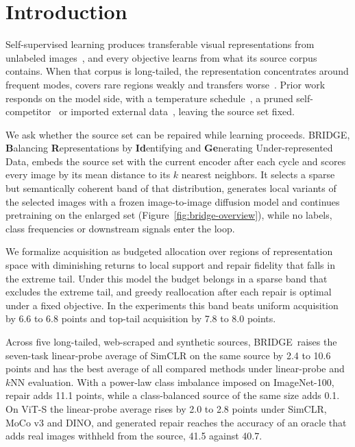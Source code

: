 \documentclass{article}
\newcommand{\method}{BRIDGE}
\begin{document}
\section{Introduction}
Self-supervised learning produces transferable visual representations from unlabeled images~\citep{chen2020simple,he2020momentum,DINO,he2022masked,oquab2023dinov2,dinov3}, and every objective learns from what its source corpus contains. When that corpus is long-tailed, the representation concentrates around frequent modes, covers rare regions weakly and transfers worse~\citep{tian2021divide,assran2210hidden,ts,sdclr}. Prior work responds on the model side, with a temperature schedule~\citep{ts}, a pruned self-competitor~\citep{sdclr} or imported external data~\citep{colt}, leaving the source set fixed.

We ask whether the source set can be repaired while learning proceeds. \method, \textbf{B}alancing \textbf{R}epresentations by \textbf{Id}entifying and \textbf{Ge}nerating Under-represented Data, embeds the source set with the current encoder after each cycle and scores every image by its mean distance to its $k$ nearest neighbors. It selects a sparse but semantically coherent band of that distribution, generates local variants of the selected images with a frozen image-to-image diffusion model and continues pretraining on the enlarged set (Figure~\ref{fig:bridge-overview}), while no labels, class frequencies or downstream signals enter the loop.

We formalize acquisition as budgeted allocation over regions of representation space with diminishing returns to local support and repair fidelity that falls in the extreme tail. Under this model the budget belongs in a sparse band that excludes the extreme tail, and greedy reallocation after each repair is optimal under a fixed objective. In the experiments this band beats uniform acquisition by 6.6 to 6.8 points and top-tail acquisition by 7.8 to 8.0 points.

Across five long-tailed, web-scraped and synthetic sources, \method\ raises the seven-task linear-probe average of SimCLR on the same source by 2.4 to 10.6 points and has the best average of all compared methods under linear-probe and $k$NN evaluation. With a power-law class imbalance imposed on ImageNet-100, repair adds 11.1 points, while a class-balanced source of the same size adds 0.1. On ViT-S the linear-probe average rises by 2.0 to 2.8 points under SimCLR, MoCo v3 and DINO, and generated repair reaches the accuracy of an oracle that adds real images withheld from the source, 41.5 against 40.7.
\end{document}
